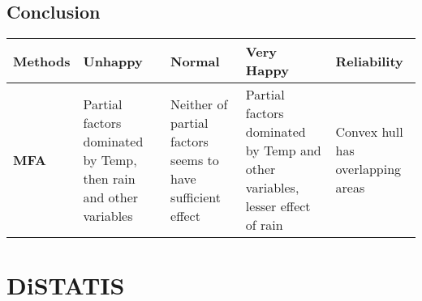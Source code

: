 \documentclass[]{book}
\begin{document}
\hypertarget{conclusion-5}{%
\section{Conclusion}\label{conclusion-5}}

\begin{longtable}[]{@{}lllll@{}}
\toprule
\begin{minipage}[b]{0.15\columnwidth}\raggedright
\textbf{Methods}\strut
\end{minipage} & \begin{minipage}[b]{0.20\columnwidth}\raggedright
\textbf{Unhappy}\strut
\end{minipage} & \begin{minipage}[b]{0.19\columnwidth}\raggedright
\textbf{Normal}\strut
\end{minipage} & \begin{minipage}[b]{0.22\columnwidth}\raggedright
\textbf{Very Happy}\strut
\end{minipage} & \begin{minipage}[b]{0.10\columnwidth}\raggedright
\textbf{Reliability}\strut
\end{minipage}\tabularnewline
\midrule
\endhead
\begin{minipage}[t]{0.15\columnwidth}\raggedright
\textbf{MFA}\strut
\end{minipage} & \begin{minipage}[t]{0.20\columnwidth}\raggedright
Partial factors dominated by Temp, then rain and other variables\strut
\end{minipage} & \begin{minipage}[t]{0.19\columnwidth}\raggedright
Neither of partial factors seems to have sufficient effect\strut
\end{minipage} & \begin{minipage}[t]{0.22\columnwidth}\raggedright
Partial factors dominated by Temp and other variables, lesser effect of
rain\strut
\end{minipage} & \begin{minipage}[t]{0.10\columnwidth}\raggedright
Convex hull has overlapping areas\strut
\end{minipage}\tabularnewline
\bottomrule
\end{longtable}

\hypertarget{distatis}{%
\chapter{DiSTATIS}\label{distatis}}
\end{document}
